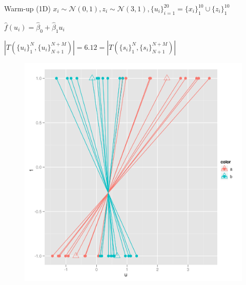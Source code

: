 \documentclass{beamer}
\begin{document}
\begin{frame}{Warm-up (1D)}
  $x_i \sim \mathcal{N}(0,1), z_i \sim \mathcal{N}(3,1),
  \{u_i\}_{i=1}^{20} = \{x_i\}_1^{10} \cup \{z_i\}_1^{10}$ \pause

  $\hat{f}(u_i) = \hat{\beta}_0 + \hat{\beta}_1 u_i$ \pause

  $|T(\{u_i\}_1^N,\{u_i\}_{N+1}^{N+M})| = 6.12 = |T(\{s_i\}_1^N,\{s_i\}_{N+1}^{N+M})|$
  \begin{figure}
   \centering
   \includegraphics[scale=.3]{1D.png}
 \end{figure}  
\end{frame}
\end{document}
